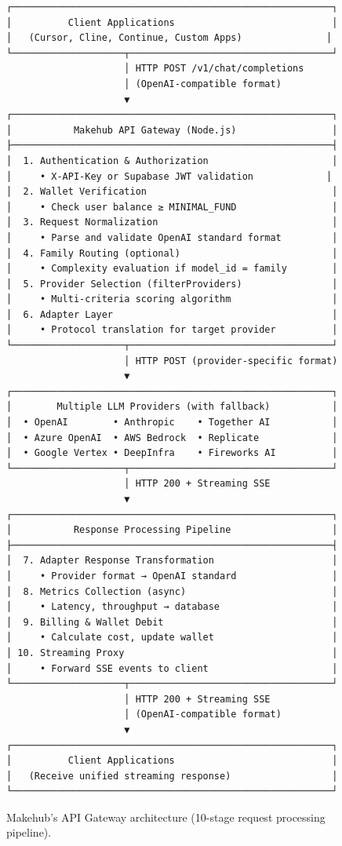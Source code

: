 \documentclass[english]{article}
\begin{document}
\begin{figure}[H]
\centering
\begin{verbatim}
┌─────────────────────────────────────────────────────────┐
│          Client Applications                            │
│   (Cursor, Cline, Continue, Custom Apps)               │
└────────────────────┬────────────────────────────────────┘
                     │ HTTP POST /v1/chat/completions
                     │ (OpenAI-compatible format)
                     ▼
┌─────────────────────────────────────────────────────────┐
│           Makehub API Gateway (Node.js)                 │
├─────────────────────────────────────────────────────────┤
│  1. Authentication & Authorization                      │
│     • X-API-Key or Supabase JWT validation             │
│  2. Wallet Verification                                 │
│     • Check user balance ≥ MINIMAL_FUND                 │
│  3. Request Normalization                               │
│     • Parse and validate OpenAI standard format         │
│  4. Family Routing (optional)                           │
│     • Complexity evaluation if model_id = family        │
│  5. Provider Selection (filterProviders)                │
│     • Multi-criteria scoring algorithm                  │
│  6. Adapter Layer                                       │
│     • Protocol translation for target provider          │
└────────────────────┬────────────────────────────────────┘
                     │ HTTP POST (provider-specific format)
                     ▼
┌─────────────────────────────────────────────────────────┐
│        Multiple LLM Providers (with fallback)           │
│  • OpenAI        • Anthropic    • Together AI           │
│  • Azure OpenAI  • AWS Bedrock  • Replicate             │
│  • Google Vertex • DeepInfra    • Fireworks AI          │
└────────────────────┬────────────────────────────────────┘
                     │ HTTP 200 + Streaming SSE
                     ▼
┌─────────────────────────────────────────────────────────┐
│           Response Processing Pipeline                  │
├─────────────────────────────────────────────────────────┤
│  7. Adapter Response Transformation                     │
│     • Provider format → OpenAI standard                 │
│  8. Metrics Collection (async)                          │
│     • Latency, throughput → database                    │
│  9. Billing & Wallet Debit                              │
│     • Calculate cost, update wallet                     │
│ 10. Streaming Proxy                                     │
│     • Forward SSE events to client                      │
└────────────────────┬────────────────────────────────────┘
                     │ HTTP 200 + Streaming SSE
                     │ (OpenAI-compatible format)
                     ▼
┌─────────────────────────────────────────────────────────┐
│          Client Applications                            │
│   (Receive unified streaming response)                  │
└─────────────────────────────────────────────────────────┘
\end{verbatim}
\caption{Makehub's API Gateway architecture (10-stage request processing pipeline).}
\label{fig:makehub_architecture}
\end{figure}
\end{document}
